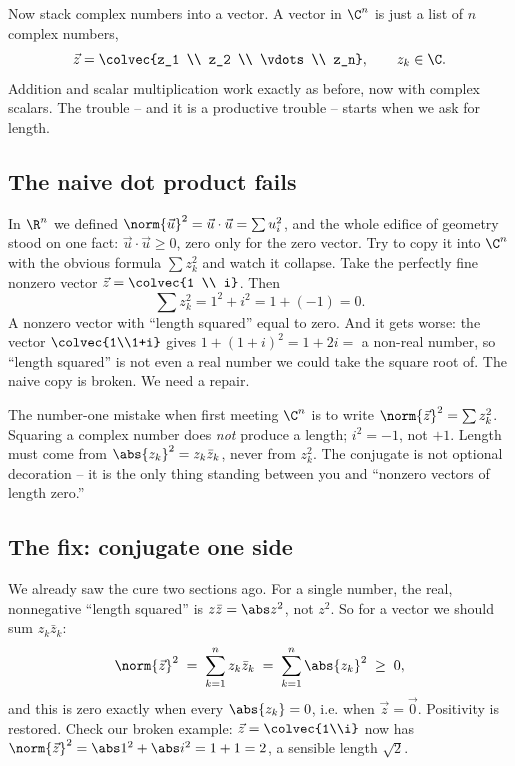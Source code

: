 Now stack complex numbers into a vector. A vector in $\C^n$ is just a list of $n$
complex numbers,
\[
  \vec z = \colvec{z_1 \\ z_2 \\ \vdots \\ z_n}, \qquad z_k\in\C.
\]
Addition and scalar multiplication work exactly as before, now with complex
scalars. The trouble -- and it is a productive trouble -- starts when we ask for
length.

\subsection{The naive dot product fails}

In $\R^n$ we defined $\norm{\vec u}^2 = \vec u\cdot\vec u = \sum u_i^2$, and the
whole edifice of geometry stood on one fact: $\vec u\cdot\vec u \ge 0$, zero only
for the zero vector. Try to copy it into $\C^n$ with the obvious formula
$\sum z_k^2$ and watch it collapse. Take the perfectly fine nonzero vector
$\vec z = \colvec{1 \\ i}$. Then
\[
  \sum z_k^2 = 1^2 + i^2 = 1 + (-1) = 0.
\]
A nonzero vector with ``length squared'' equal to zero. And it gets worse: the
vector $\colvec{1\\1+i}$ gives $1 + (1+i)^2 = 1 + 2i = $ a non-real number, so
``length squared'' is not even a real number we could take the square root of.
The naive copy is broken. We need a repair.

\begin{trapbox}
The number-one mistake when first meeting $\C^n$ is to write $\norm{\vec z}^2 =
\sum z_k^2$. Squaring a complex number does \emph{not} produce a length; $i^2=-1$,
not $+1$. Length must come from $\abs{z_k}^2 = z_k\bar z_k$, never from $z_k^2$.
The conjugate is not optional decoration -- it is the only thing standing between
you and ``nonzero vectors of length zero.''
\end{trapbox}

\subsection{The fix: conjugate one side}

We already saw the cure two sections ago. For a single number, the real,
nonnegative ``length squared'' is $z\bar z = \abs z^2$, not $z^2$. So for a vector
we should sum $z_k\bar z_k$:
\[
  \norm{\vec z}^2 \;=\; \sum_{k=1}^n z_k\bar z_k
  \;=\; \sum_{k=1}^n \abs{z_k}^2 \;\ge\; 0,
\]
and this is zero exactly when every $\abs{z_k}=0$, i.e. when $\vec z = \vec 0$.
Positivity is restored. Check our broken example: $\vec z=\colvec{1\\i}$ now has
$\norm{\vec z}^2 = \abs 1^2 + \abs i^2 = 1 + 1 = 2$, a sensible length
$\sqrt 2$.

